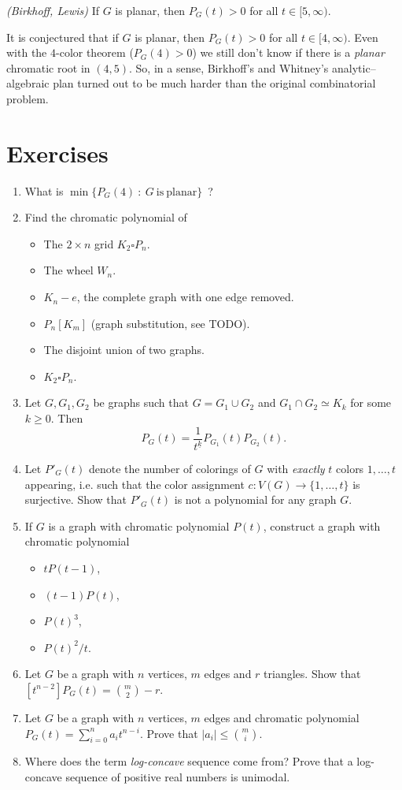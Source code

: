 \begin{theorem} \emph{(Birkhoff, Lewis)}
If $G$ is planar, then $P_G(t)>0$ for all $t\in [5,\infty)$.
\end{theorem}

It is conjectured that if $G$ is planar, then $P_G(t)>0$ for all $t\in [4,\infty)$. Even with the $4$-color theorem ($P_G(4)>0$) we still don't know if there is a \emph{planar} chromatic root in $(4,5)$. So, in a sense, Birkhoff's and Whitney's analytic--algebraic plan turned out to be much harder than the original combinatorial problem.

\section{Exercises}

\begin{enumerate}
\item What is $\min\{P_G(4)~:~G\ \mathrm{is\ planar}\}$\ ?
\item Find the chromatic polynomial of
\begin{itemize}
\item The $2\times n$ grid $K_2\square P_n$.
\item The wheel $W_n$.
\item $K_n-e$, the complete graph with one edge removed.
\item $P_n[K_m]$ (graph substitution, see TODO).
\item The disjoint union of two graphs.
\item $K_2 \square P_n$.
\end{itemize}
\item  Let $G,G_1,G_2$ be graphs such that $G=G_1 \cup G_2$ and $G_1 \cap G_2 \simeq K_k$ for some $k\geqslant 0$. Then
$$P_G(t)=\frac{1}{t^{\underline{k}}}P_{G_1}(t)P_{G_2}(t).$$
\item Let $P'_G(t)$ denote the number of colorings of $G$ with \emph{exactly} $t$ colors $1,\ldots,t$ appearing, i.e. such that the color assignment $c:V(G)\to\{1,\ldots,t\}$ is surjective. Show that $P'_G(t)$ is not a polynomial for any graph $G$.
\item If $G$ is a graph with chromatic polynomial $P(t)$, construct a graph with chromatic polynomial
\begin{itemize}
\item $tP(t-1)$,
\item $(t-1)P(t)$,
\item $P(t)^3$,
\item $P(t)^2/t$.
\end{itemize}
\item Let $G$ be a graph with $n$ vertices, $m$ edges and $r$ triangles. Show that $[t^{n-2}]P_G(t)={m\choose 2}-r$.
\item Let $G$ be a graph with $n$ vertices, $m$ edges and chromatic polynomial $P_G(t)=\sum_{i=0}^na_it^{n-i}$. Prove that $|a_i|\leq{m\choose i}$.
\item Where does the term \textit{log-concave} sequence come from? Prove that a log-concave sequence of positive real numbers is unimodal.
\end{enumerate}
